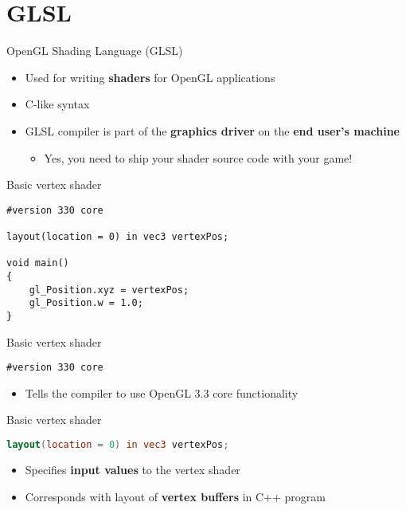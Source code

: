\part{GLSL}
\frame{\partpage}

\lstset{language=GLSL}

\begin{frame}{OpenGL Shading Language (GLSL)}
	\begin{itemize}
		\pause\item Used for writing \textbf{shaders} for OpenGL applications
		\pause\item C-like syntax
		\pause\item GLSL compiler is part of the \textbf{graphics driver}
			on the \textbf{end user's machine}
			\begin{itemize}
				\pause\item Yes, you need to ship your shader source code with your game!
			\end{itemize}
	\end{itemize}
\end{frame}

\begin{frame}[fragile]{Basic vertex shader}
	\begin{lstlisting}
#version 330 core

layout(location = 0) in vec3 vertexPos;

void main()
{
    gl_Position.xyz = vertexPos;
    gl_Position.w = 1.0;
}
	\end{lstlisting}
\end{frame}

\begin{frame}[fragile]{Basic vertex shader}
	\begin{lstlisting}
#version 330 core
	\end{lstlisting}
	\begin{itemize}
		\pause\item Tells the compiler to use OpenGL 3.3 core functionality
	\end{itemize}
\end{frame}

\begin{frame}[fragile]{Basic vertex shader}
	\begin{lstlisting}[language=GLSL]
layout(location = 0) in vec3 vertexPos;
	\end{lstlisting}
	\begin{itemize}
		\pause\item Specifies \textbf{input values} to the vertex shader
		\pause\item Corresponds with layout of \textbf{vertex buffers} in C++ program
	\end{itemize}
\end{frame}

